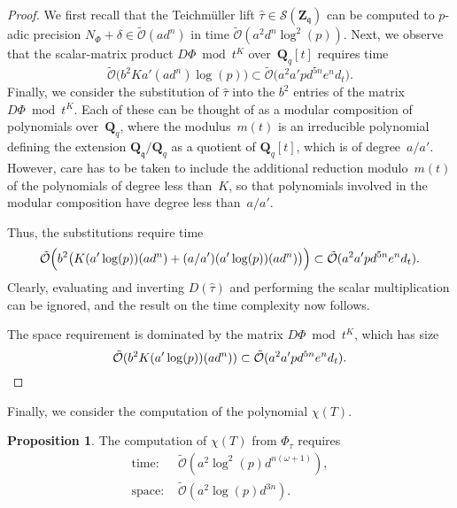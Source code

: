\documentclass[a4paper,11pt]{article}
\numberwithin{equation}{section}
\newcommand{\ZZ}{\mathbf{Z}} %
\newcommand{\QQ}{\mathbf{Q}} %
\providecommand{\SoftOh}{\tilde{\mathcal{O}}} %
\theoremstyle{definition}
\newtheorem{prop}[thm]{Proposition}
\begin{document}
\begin{proof}
We first recall that the Teichm\"uller lift 
$\hat{\tau} \in \mathcal{S}(\ZZ_{\mathfrak{q}})$ 
can be computed to $p$-adic precision $N_{\Phi}+\delta \in \SoftOh(a d^n)$ 
in time $\SoftOh(a^2 d^n \log^2(p))$.  Next, we observe that the 
scalar-matrix product $D \Phi \bmod t^K$ over~$\QQ_q[t]$ 
requires time 
\begin{equation*}
\SoftOh\bigl( b^2 K a' (a d^n) \log(p) \bigr) 
    \subset \SoftOh\bigl( a^2 a' p d^{5n} e^n d_t \bigr).
\end{equation*}
Finally, we consider the substitution of $\hat{\tau}$ 
into the $b^2$ entries of the matrix $D \Phi \bmod t^K$. 
Each of these can be thought of as a modular composition of polynomials 
over~$\QQ_{q}$, where the modulus~$m(t)$ is an irreducible polynomial defining 
the extension $\QQ_{\mathfrak{q}} / \QQ_{q}$ as a quotient of $\QQ_q[t]$, 
which is of degree~$a/a'$. However, care has to be taken to include the 
additional reduction modulo~$m(t)$ of the polynomials of degree less than~$K$, 
so that polynomials involved in the modular composition have degree less 
than~$a/a'$. 

Thus, the substitutions require time %
\begin{equation*}
\SoftOh\Bigl( b^2 \bigl(K (a' \log(p)) (a d^n) + (a/a') (a' \log(p)) (a d^n) \bigr) \Bigr)
    \subset \SoftOh(a^2 a' p d^{5n} e^n d_t).
\end{equation*}
Clearly, evaluating and inverting $D(\hat{\tau})$ and performing the 
scalar multiplication can be ignored, and the result on the time complexity now follows.

The space requirement is dominated by the matrix $D\Phi \bmod t^K$, 
which has size 
\begin{equation*}
\SoftOh(b^2 K (a' \log(p)) (a d^n)) \subset \SoftOh(a^2 a' p d^{5n} e^n d_t). 
\qedhere
\end{equation*}
\end{proof}

Finally, we consider the computation of the polynomial $\chi(T)$.

\begin{prop}
The computation of $\chi(T)$ from $\Phi_{\tau}$ requires
\begin{align*}
\mbox{time: }  & \SoftOh(a^2  \log^2(p) d^{n(\omega+1)}), \\
\mbox{space: } & \SoftOh(a^2 \log(p) d^{3n}).
\end{align*}
\end{prop}
\end{document}

